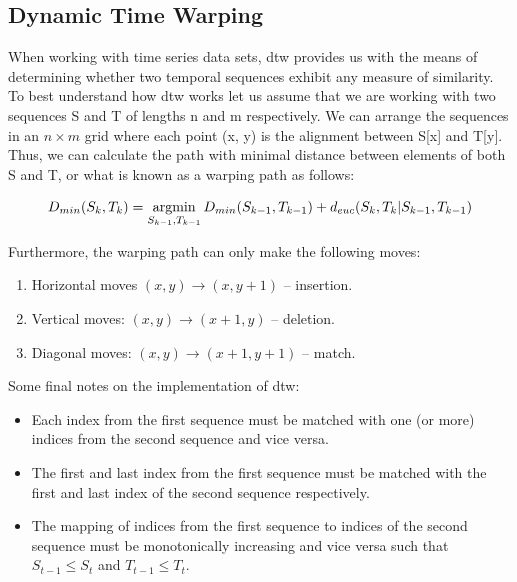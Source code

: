 \subsection{Dynamic Time Warping}
\label{subsec:Background-Information:Dynamic-Time-Warping}
When working with time series data sets, \gls{dtw} provides us with the means of determining whether two temporal sequences exhibit any measure of similarity. To best understand how \gls{dtw} works let us assume that we are working with two sequences S and T of lengths n and m respectively. We can arrange the sequences in an $n \times m$ grid where each point (x, y) is the alignment between S[x] and T[y]. Thus, we can calculate the path with minimal distance between elements of both S and T, or what is known as a warping path as follows:

\begin{equation}
    D_{min}(S_k, T_k) = \operatorname*{argmin}_{S_{k-1}, T_{k-1}} D_{min} (S_{k-1}, T_{k-1}) + d_{euc}(S_k, T_k | S_{k-1}, T_{k-1})
\label{eq:DTW}
\end{equation}

\noindent \newline Furthermore, the warping path can only make the following moves:

\begin{enumerate}
    \item Horizontal moves $(x, y) \rightarrow (x, y + 1)$ -- insertion.
    \item Vertical moves: $(x, y) \rightarrow (x + 1, y)$ -- deletion.
    \item Diagonal moves: $(x, y) \rightarrow (x + 1, y + 1)$ -- match.
\end{enumerate}

\noindent \newline Some final notes on the implementation of \gls{dtw}:

\begin{itemize}
    \item Each index from the first sequence must be matched with one (or more) indices from the second sequence and vice versa.
    \item The first and last index from the first sequence must be matched with the first and last index of the second sequence respectively.
    \item The mapping of indices from the first sequence to indices of the second sequence must be monotonically increasing and vice versa such that $S_{t-1} \leq S_{t}$ and $T_{t-1} \leq T_{t}$.
\end{itemize}

